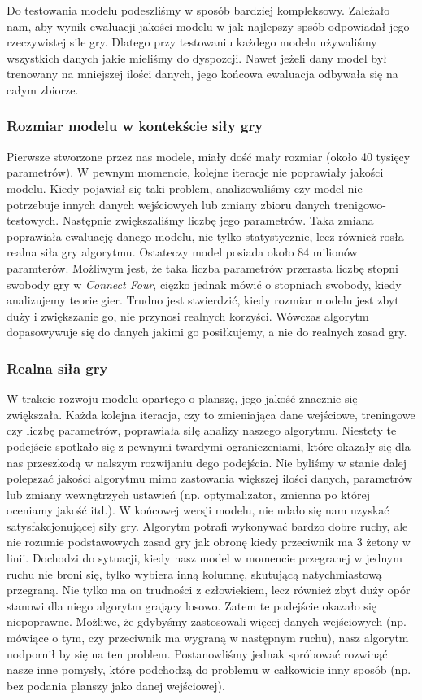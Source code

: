 \documentclass[12pt]{article}
\begin{document}
Do testowania modelu podeszliśmy w sposób bardziej kompleksowy. Zależało nam, aby wynik ewaluacji jakości modelu w jak najlepszy spsób odpowiadał jego rzeczywistej sile gry. Dlatego przy testowaniu każdego modelu używaliśmy wszystkich danych jakie mieliśmy do dyspozcji. Nawet jeżeli dany model był trenowany na mniejszej ilości danych, jego końcowa ewaluacja odbywała się na całym zbiorze.

\subsubsection{Rozmiar modelu w kontekście siły gry}

Pierwsze stworzone przez nas modele, miały dość mały rozmiar (około 40 tysięcy parametrów). W pewnym momencie, kolejne iteracje nie poprawiały jakości modelu. Kiedy pojawiał się taki problem, analizowaliśmy czy model nie potrzebuje innych danych wejściowych lub zmiany zbioru danych trenigowo-testowych. Następnie zwiększaliśmy liczbę jego parametrów. Taka zmiana poprawiała ewaluację danego modelu, nie tylko statystycznie, lecz również rosła realna siła gry algorytmu. Ostateczy model posiada około 84 milionów paramterów. Możliwym jest, że taka liczba parametrów przerasta liczbę stopni swobody gry w \textit{Connect Four}, ciężko jednak mówić o stopniach swobody, kiedy analizujemy teorie gier. Trudno jest stwierdzić, kiedy rozmiar modelu jest zbyt duży i zwiększanie go, nie przynosi realnych korzyści. Wówczas algorytm dopasowywuje się do danych jakimi go posiłkujemy, a nie do realnych zasad gry.

\subsubsection{Realna siła gry}

W trakcie rozwoju modelu opartego o planszę, jego jakość znacznie się zwiększała. Każda kolejna iteracja, czy to zmieniająca dane wejściowe, treningowe czy liczbę parametrów, poprawiała siłę analizy naszego algorytmu. Niestety te podejście spotkało się z pewnymi twardymi ograniczeniami, które okazały się dla nas przeszkodą w nalszym rozwijaniu dego podejścia. Nie byliśmy w stanie dalej polepszać jakości algorytmu mimo zastowania większej ilości danych, parametrów lub zmiany wewnętrzych ustawień (np. optymalizator, zmienna po której oceniamy jakość itd.). W końcowej wersji modelu, nie udało się nam uzyskać satysfakcjonującej siły gry. Algorytm potrafi wykonywać bardzo dobre ruchy, ale nie rozumie podstawowych zasad gry jak obronę kiedy przeciwnik ma 3 żetony w linii. Dochodzi do sytuacji, kiedy nasz model w momencie przegranej w jednym ruchu nie broni się, tylko wybiera inną kolumnę, skutującą natychmiastową przegraną. Nie tylko ma on trudności z człowiekiem, lecz również zbyt duży opór stanowi dla niego algorytm grający losowo. Zatem te podejście okazało się niepoprawne. Możliwe, że gdybyśmy zastosowali więcej danych wejściowych (np. mówiące o tym, czy przeciwnik ma wygraną w następnym ruchu), nasz algorytm uodpornił by się na ten problem. Postanowliśmy jednak spróbować rozwinąć nasze inne pomysły, które podchodzą do problemu w całkowicie inny sposób (np. bez podania planszy jako danej wejściowej).
\end{document}
